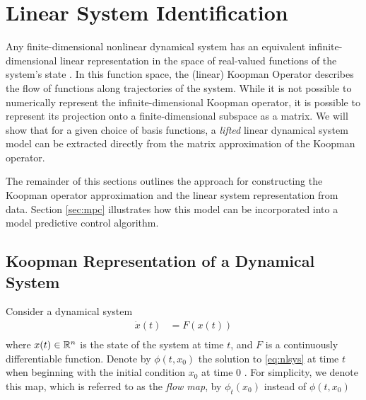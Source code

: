 \section{Linear System Identification}
\label{sec:sysid}

Any finite-dimensional nonlinear dynamical system has an equivalent infinite-dimensional linear representation in the space of real-valued functions of the system's state \cite{mauroy2016linear} .
In this function space, the (linear) Koopman Operator describes the flow of functions along trajectories of the system.
While it is not possible to numerically represent the infinite-dimensional Koopman operator, it is possible to represent its projection onto a finite-dimensional subspace as a matrix.
We will show that for a given choice of basis functions, a \emph{lifted} linear dynamical system model can be extracted directly from the matrix approximation of the Koopman operator.

The remainder of this sections outlines the approach for constructing the Koopman operator approximation and the linear system representation from data.
Section \ref{sec:mpc} illustrates how this model can be incorporated into a model predictive control algorithm.

\subsection{Koopman Representation of a Dynamical System}

Consider a dynamical system
\begin{align}
    \dot{x}(t) &= F (x(t)) \\
    \label{eq:nlsys}
\end{align}
where $x(t) \in \mathbb{R}^n$ is the state of the system at time $t$, and ${F}$ is a continuously differentiable function.
Denote by $\phi(t,x_0)$ the solution to \eqref{eq:nlsys} at time $t$ when beginning with the initial condition $x_0$ at time $0$ .
For simplicity, we denote this map, which is referred to as the \emph{flow map}, by $\phi_t (x_0)$ instead of $\phi (t, x_0)$

